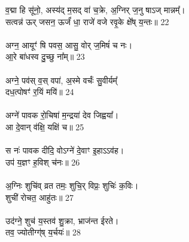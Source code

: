 व॒द्मा हि सू॑नो॒, अस्य॑द् म॒सद् वा॑ च॒क्रे, अ॒ग्निर् ज॒नु षाऽज् मान्नम्᳚।\\
सत्वन्न॑ ऊर् जसन॒ ऊर्जं॑ धा॒ राजे॑ वजे रवृ॒के क्षे᳚ष् य॒न्तः॥ 22\\
\\
अग्न॒ आयूꣳ॑ षि पवस॒ आसु॒ वोर् ज॒मिषं॑ च नः।\\
आ॒रे बा॑धस्व दु॒च्छु ना᳚म्॥ 23\\
\\
अग्ने॒ पव॑स् व॒स् वपा॑, अ॒स्मे वर्चः॑॑ सु॒वीर्यम्᳚\\
दध॒त्पोषꣳ॑ र॒यिं मयि॑॥ 24\\
\\
अग्ने॑ पावक रो॒चिषा॑ म॒न्द्रया॑ देव जिह्वया᳚।\\
आ दे॒वान् व॑क्षि॒ यक्षि॑ च॥ 25\\
\\
स नः॑ पावक दीदि॒ वोऽग्ने॑ दे॒वाꣳ इ॒हाऽऽव॑ह।\\
उप॑ य॒ज्ञꣳ ह॒विश् च॑नः॥ 26\\
\\
अ॒ग्निः शुचि॑व् व्रत तमः॒ शुचि॒र् विप्रः॒ शुचिः॑ क॒विः।\\
शुची॑ रोचत॒ आहु॑तः॥ 27\\
\\
उद॑ग्ने॒ शुच॑ य॒स्तव॑ शु॒क्रा, भ्राज॑न्त ईरते।\\
तव॒ ज्योतीग्ग्॑ष् य॒र्चयः॑॥ 28\\
\\
